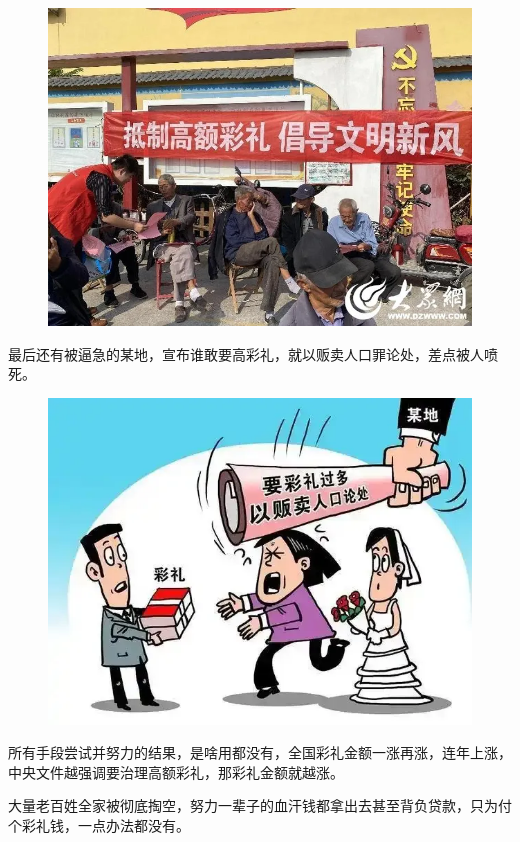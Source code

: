 \documentclass[UTF8,11pt,oneside]{ctexart}
\begin{document}
\begin{figure}[H]
    \centering
    \includegraphics[width=13cm]{2025-04-17-006.png}
\end{figure}

最后还有被逼急的某地，宣布谁敢要高彩礼，就以贩卖人口罪论处，差点被人喷死。

\begin{figure}[H]
    \centering
    \includegraphics[width=13cm]{2025-04-17-007.png}
\end{figure}

所有手段尝试并努力的结果，是啥用都没有，全国彩礼金额一涨再涨，连年上涨，中央文件越强调要治理高额彩礼，那彩礼金额就越涨。

大量老百姓全家被彻底掏空，努力一辈子的血汗钱都拿出去甚至背负贷款，只为付个彩礼钱，一点办法都没有。
\end{document}
